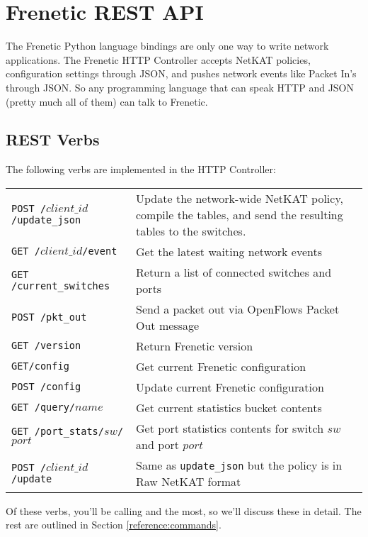 
\chapter{Frenetic REST API}

The Frenetic Python language bindings are only one way to write network applications.  The Frenetic
HTTP Controller accepts NetKAT policies, configuration settings through JSON, and pushes network
events like Packet In's through JSON.  So any programming language that can speak HTTP and JSON (pretty
much all of them) can talk to Frenetic.  

\section{REST Verbs}
\label{frenetic_rest_api:urls}

The following verbs are implemented in the HTTP Controller:

\bigskip
\begin{tabularx}{\linewidth}{lXX}
\texttt{POST /$client\_id$/update\_json} & Update the network-wide NetKAT policy, compile the tables, and send the
resulting tables to the switches. \\
\texttt{GET /$client\_id$/event} & Get the latest waiting network events \\
\texttt{GET /current\_switches} & Return a list of connected switches and ports \\
\texttt{POST /pkt\_out} & Send a packet out via OpenFlows Packet Out message \\
\texttt{GET /version} & Return Frenetic version \\
\texttt{GET/config} & Get current Frenetic configuration \\
\texttt{POST /config} & Update current Frenetic configuration \\
\texttt{GET /query/$name$} & Get current statistics bucket contents \\
\texttt{GET /port\_stats/$sw$/$port$} & Get port statistics contents for switch $sw$ and port $port$ \\
\texttt{POST /$client\_id$/update} & Same as \texttt{update\_json} but the policy is in Raw NetKAT format 
\end{tabularx}

Of these verbs, you'll be calling  and  the most, so we'll discuss 
these in detail.  The rest are outlined in Section \ref{reference:commands}.

